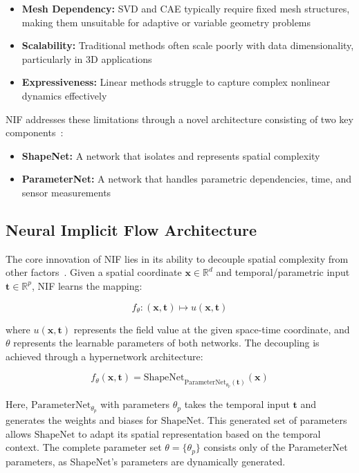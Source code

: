 \documentclass[10pt,journal,compsoc,onecolumn]{IEEEtran}
\begin{document}
\begin{itemize}
    \item \textbf{Mesh Dependency:} SVD and CAE typically require fixed mesh structures, making them unsuitable for adaptive or variable geometry problems
    \item \textbf{Scalability:} Traditional methods often scale poorly with data dimensionality, particularly in 3D applications
    \item \textbf{Expressiveness:} Linear methods struggle to capture complex nonlinear dynamics effectively
\end{itemize}

NIF addresses these limitations through a novel architecture consisting of two key components~\cite{nif2023}:

\begin{itemize}
    \item \textbf{ShapeNet:} A network that isolates and represents spatial complexity
    \item \textbf{ParameterNet:} A network that handles parametric dependencies, time, and sensor measurements
\end{itemize}

\subsection{Neural Implicit Flow Architecture}
The core innovation of NIF lies in its ability to decouple spatial complexity from other factors~\cite{nif2023}. Given a spatial coordinate $\mathbf{x} \in \mathbb{R}^d$ and temporal/parametric input $\mathbf{t} \in \mathbb{R}^p$, NIF learns the mapping:

\begin{equation}
    f_\theta: (\mathbf{x}, \mathbf{t}) \mapsto u(\mathbf{x}, \mathbf{t})
\end{equation}

where $u(\mathbf{x}, \mathbf{t})$ represents the field value at the given space-time coordinate, and $\theta$ represents the learnable parameters of both networks. The decoupling is achieved through a hypernetwork architecture:

\begin{equation}
    f_\theta(\mathbf{x}, \mathbf{t}) = \text{ShapeNet}_{\text{ParameterNet}_{\theta_p}(\mathbf{t})}(\mathbf{x})
\end{equation}

Here, $\text{ParameterNet}_{\theta_p}$ with parameters $\theta_p$ takes the temporal input $\mathbf{t}$ and generates the weights and biases for $\text{ShapeNet}$. This generated set of parameters allows $\text{ShapeNet}$ to adapt its spatial representation based on the temporal context. The complete parameter set $\theta = \{\theta_p\}$ consists only of the ParameterNet parameters, as ShapeNet's parameters are dynamically generated.
\end{document}
